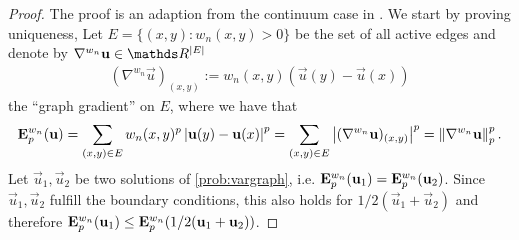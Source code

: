%
\begin{proof}
The	proof is an adaption from the continuum case in \cite[Thm. 2.16]{lindqvist2017notes}. We start by proving uniqueness, 	
Let $E = \{(x,y): w_n(x,y)>0\}$ be the set of all active edges and denote by $\nabla^{w_n} \vec u \in \R^{\abs{E}}$
%
\begin{align*}
(\nabla^{w_n} \vec u)_{(x,y)} := w_n(x,y) \left(\vec u(y) - \vec u(x)\right)
\end{align*}
%
the \enquote{graph gradient} on $E$, where we have that
%
\begin{align*}
\mathbf{E}^{w_n}_p (\mathbf{u}) = \sum_{(x,y)\in E} w_n(x,y)^p \left|\mathbf{u}(y) - \mathbf{u}(x)\right|^p 
= \sum_{(x,y)\in E} \left|(\nabla^{w_n} \mathbf{u})_{(x,y)}\right|^p=
\left\|\nabla^{w_n}\mathbf{u}\right\|_p^p.	
\end{align*}
%
%
Let $\vec u_1, \vec u_2$ be two  solutions of \cref{prob:vargraph}, i.e. $\mathbf{E}^{w_n}_p (\mathbf{u}_1)= \mathbf{E}^{w_n}_p (\mathbf{u}_2)$. Since $\vec u_1,\vec u_2$ fulfill the boundary conditions, this also holds for $1/2(\vec u_1 + \vec u_2)$ and therefore $\mathbf{E}^{w_n}_p(\mathbf{u}_1)\leq\mathbf{E}^{w_n}_p(1/2(\mathbf{u}_1 + \mathbf{u}_2))$.



\end{proof}
